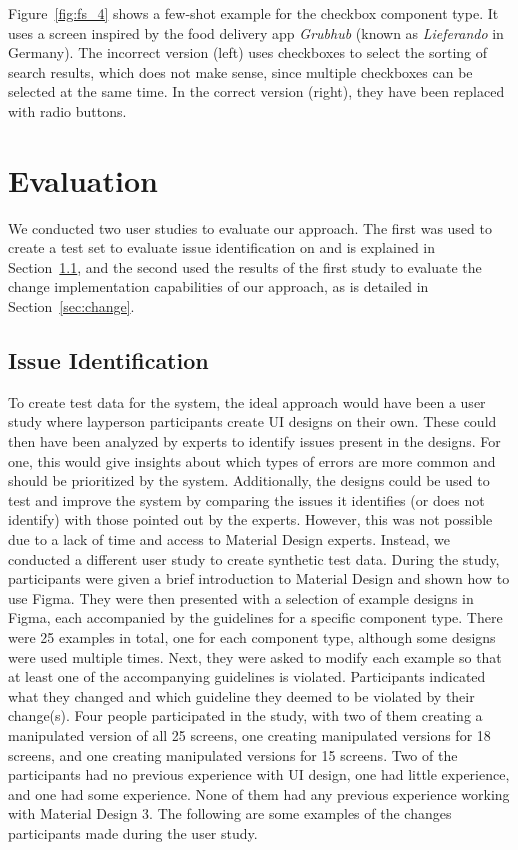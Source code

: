 \documentclass[11pt,titlepage,oneside,openany]{book}
\begin{document}
Figure~\ref{fig:fs_4} shows a few-shot example for the checkbox component type. It uses a screen inspired by the food delivery app \emph{Grubhub} \cite{noauthor_food_nodate} (known as \emph{Lieferando} in Germany). The incorrect version (left) uses checkboxes to select the sorting of search results, which does not make sense, since multiple checkboxes can be selected at the same time. In the correct version (right), they have been replaced with radio buttons.

\chapter{Evaluation}\label{cha:eval}

We conducted two user studies to evaluate our approach. The first was used to create a test set to evaluate issue identification on and is explained in Section~\ref{sec:ident}, and the second used the results of the first study to evaluate the change implementation capabilities of our approach, as is detailed in Section~\ref{sec:change}.

\section{Issue Identification}\label{sec:ident}

To create test data for the system, the ideal approach would have been a user study where layperson participants create UI designs on their own. These could then have been analyzed by experts to identify issues present in the designs. For one, this would give insights about which types of errors are more common and should be prioritized by the system. Additionally, the designs could be used to test and improve the system by comparing the issues it identifies (or does not identify) with those pointed out by the experts. However, this was not possible due to a lack of time and access to Material Design experts. Instead, we conducted a different user study to create synthetic test data. During the study, participants were given a brief introduction to Material Design and shown how to use Figma. They were then presented with a selection of example designs in Figma, each accompanied by the guidelines for a specific component type. There were 25 examples in total, one for each component type, although some designs were used multiple times. Next, they were asked to modify each example so that at least one of the accompanying guidelines is violated. Participants indicated what they changed and which guideline they deemed to be violated by their change(s). Four people participated in the study, with two of them creating a manipulated version of all 25 screens, one creating manipulated versions for 18 screens, and one creating manipulated versions for 15 screens. Two of the participants had no previous experience with UI design, one had little experience, and one had some experience. None of them had any previous experience working with Material Design 3. The following are some examples of the changes participants made during the user study.
\end{document}
